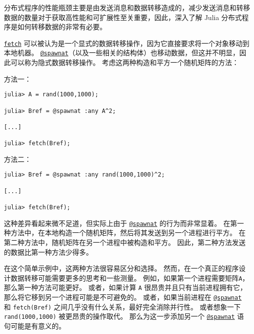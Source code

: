 分布式程序的性能瓶颈主要是由发送消息和数据转移造成的，减少发送消息和转移数据的数量对于获取高性能和可扩展性至关重要，因此，深入了解 Julia 分布式程序是如何转移数据的非常有必要。



\hyperlink{11007884648860062495}{\texttt{fetch}} 可以被认为是一个显式的数据转移操作，因为它直接要求将一个对象移动到本地机器。 \hyperlink{11231712027010946923}{\texttt{@spawnat}}（以及一些相关的结构体）也移动数据，但这并不明显，因此可以称为隐式数据转移操作。 考虑这两种构造和平方一个随机矩阵的方法：



方法一：




\begin{verbatim}
julia> A = rand(1000,1000);

julia> Bref = @spawnat :any A^2;

[...]

julia> fetch(Bref);
\end{verbatim}



方法二：




\begin{verbatim}
julia> Bref = @spawnat :any rand(1000,1000)^2;

[...]

julia> fetch(Bref);
\end{verbatim}



这种差异看起来微不足道，但实际上由于 \hyperlink{11231712027010946923}{\texttt{@spawnat}} 的行为而非常显着。 在第一种方法中，在本地构造一个随机矩阵，然后将其发送到另一个进程进行平方。 在第二种方法中，随机矩阵在另一个进程中被构造和平方。 因此，第二种方法发送的数据比第一种方法少得多。



在这个简单示例中，这两种方法很容易区分和选择。 然而，在一个真正的程序设计数据转移可能需要更多的思考和一些测量。 例如，如果第一个进程需要矩阵\texttt{A}，那么第一种方法可能更好。 或者，如果计算 \texttt{A} 很昂贵并且只有当前进程拥有它，那么将它移到另一个进程可能是不可避免的。 或者，如果当前进程在 \hyperlink{11231712027010946923}{\texttt{@spawnat}} 和 \texttt{fetch(Bref)} 之间几乎没有什么关系，最好完全消除并行性。 或者想象一下 \texttt{rand(1000,1000)} 被更昂贵的操作取代。 那么为这一步添加另一个 \hyperlink{11231712027010946923}{\texttt{@spawnat}} 语句可能是有意义的。



